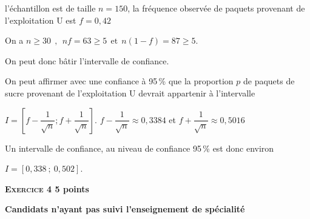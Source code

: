 \documentclass[11pt,a4paper,answers,fancyhdr]{exam}
\newcommand{\vect}[1]{\overrightarrow{\,\mathstrut#1\,}}
\def\Oijk{$\left(\text{O},~\vect{\imath},~\vect{\jmath},~\vect{k}\right)$}
\def\Oijk{$\left(\text{O};~\vect{\imath},~ \vect{\jmath},~ \vect{k}\right)$}
\begin{document}
\begin{enumerate}
\begin{solution}l'échantillon est de taille $n=150$, la fréquence observée de paquets provenant de l'exploitation U est $f=0,42$

On a $n\geqslant 30~~,~~nf=63\geqslant 5~~\text{et}~~n(1-f)=87\geqslant 5$.
	
On peut donc bâtir l'intervalle de confiance.
	
On peut affirmer avec une confiance à 95\,\% que la proportion $p$ de paquets de sucre provenant de l'exploitation U devrait appartenir à l'intervalle 

$I=\left[ f-\dfrac{1}{\sqrt{n}}  ; f+\dfrac{1}{\sqrt{n}}  \right]$.
	$f-\dfrac{1}{\sqrt{n}} \approx 0,3384$ et $f+\dfrac{1}{\sqrt{n}} \approx 0,5016$
	
Un intervalle de confiance, au niveau de confiance 95\,\% est donc environ 

$I=[0,338~;~0,502]$. 
\end{solution}
\end{enumerate}

\newpage

\label{exercice 4-obli}
\textbf{\textsc{Exercice 4} \hfill 5 points}
 
\textbf{Candidats n'ayant pas suivi l'enseignement de spécialité}

\medskip

%
\end{document}
